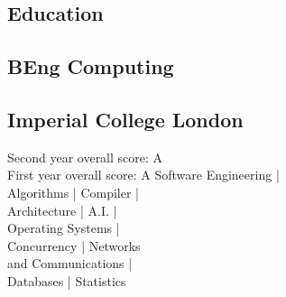 \documentclass[a4paper]{deedy-resume-openfont}
\begin{document}
%
%

%
%


\vskip 0.4cm

%
%

\begin{minipage}[t]{0.33\textwidth} 

\begin{snugshade}
\section{Education}
\end{snugshade}
\subsection{BEng Computing}
\subsection{Imperial College London}
\vskip 0.2cm
\hspace{0.6cm}Second year overall score: A\\
\hspace{0.6cm}First year overall score: A
\vskip 0.2cm
\hspace{0.6cm}Software Engineering | \\ 
\hspace{0.6cm}Algorithms | Compiler | \\
\hspace{0.6cm}Architecture | A.I. | \\
\hspace{0.6cm}Operating Systems | \\
\hspace{0.6cm}Concurrency | Networks \\
\hspace{0.6cm}and Communications | \\
\hspace{0.6cm}Databases | Statistics


\end{minipage}
\end{document}
